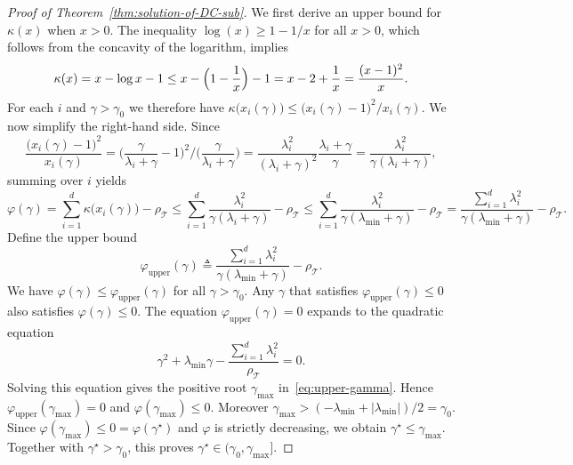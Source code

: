 \documentclass[11pt, letterpaper, oneside, reqno]{amsart}
\newcommand{\opt}{^\star}
\newcommand{\Let}{\triangleq}
\begin{document}
\begin{proof}[Proof of Theorem~\ref{thm:solution-of-DC-sub}]
We first derive an upper bound for $\kappa(x)$ when $x>0$. The inequality $\log(x) \ge 1 - 1/x$ for all $x>0$, which follows from the concavity of the logarithm, implies
\[
\kappa(x)
= x - \log x - 1
\le x - \Bigl(1 - \frac{1}{x}\Bigr) - 1
= x - 2 + \frac{1}{x}
= \frac{(x-1)^2}{x}.
\]
For each $i$ and $\gamma > \gamma_0$ we therefore have
$\kappa\bigl(x_i(\gamma)\bigr)
\le \bigl(x_i(\gamma)-1\bigr)^2 / x_i(\gamma)$.
We now simplify the right-hand side. Since
\[
\frac{\bigl(x_i(\gamma)-1\bigr)^2}{x_i(\gamma)}
= \bigl(\frac{\gamma}{\lambda_i + \gamma} - 1\bigr)^2 / \bigl( \frac{\gamma}{\lambda_i + \gamma} \bigr)
= \frac{\lambda_i^2}{(\lambda_i + \gamma)^2} \frac{\lambda_i + \gamma}{\gamma}
= \frac{\lambda_i^2}{\gamma(\lambda_i + \gamma)},
\]
summing over $i$ yields
\[
\varphi(\gamma)
= \sum_{i=1}^d \kappa\bigl(x_i(\gamma)\bigr) - \rho_{\mathcal T}
\le \sum_{i=1}^d \frac{\lambda_i^2}{\gamma(\lambda_i + \gamma)} - \rho_{\mathcal T}
\le \sum_{i=1}^d \frac{\lambda_i^2}{\gamma(\lambda_{\min} + \gamma)} - \rho_{\mathcal T}
= \frac{\sum_{i=1}^d \lambda_i^2}{\gamma(\lambda_{\min} + \gamma)} - \rho_{\mathcal T}.
\]
Define the upper bound
\[
\varphi_{\mathrm{upper}}(\gamma)
\Let \frac{\sum_{i=1}^d \lambda_i^2}{\gamma(\lambda_{\min} + \gamma)} - \rho_{\mathcal T}.
\]
We have $\varphi(\gamma) \le \varphi_{\mathrm{upper}}(\gamma)$ for all $\gamma > \gamma_0$. Any $\gamma$ that satisfies $\varphi_{\mathrm{upper}}(\gamma) \le 0$ also satisfies $\varphi(\gamma) \le 0$.
The equation $\varphi_{\mathrm{upper}}(\gamma) = 0$ expands to the quadratic equation
\[
\gamma^2 + \lambda_{\min}\gamma - \frac{\sum_{i=1}^d \lambda_i^2}{\rho_{\mathcal T}} = 0.
\]
Solving this equation gives the positive root $\gamma_{\max}$ in~\eqref{eq:upper-gamma}.
Hence
$\varphi_{\mathrm{upper}}(\gamma_{\max})=0$ and $\varphi(\gamma_{\max})\le0$. Moreover
$\gamma_{\max}>(-\lambda_{\min}+|\lambda_{\min}|)/2=\gamma_0$. Since
$\varphi(\gamma_{\max})\le0=\varphi(\gamma\opt)$ and $\varphi$ is strictly decreasing, we obtain
$\gamma\opt\le\gamma_{\max}$. Together with $\gamma\opt>\gamma_0$, this proves
$\gamma\opt\in(\gamma_0,\gamma_{\max}]$.
\end{proof}
\end{document}
